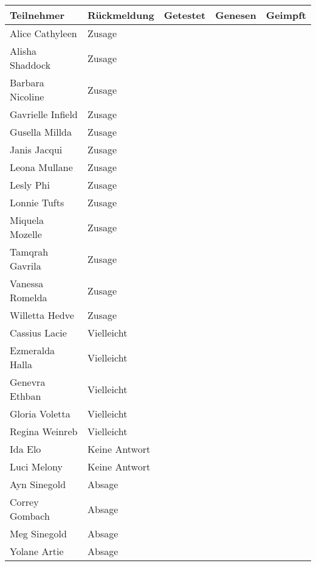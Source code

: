 \begin{tabular}{lllll}
\toprule
       Teilnehmer &   Rückmeldung & Getestet & Genesen & Geimpft \\
\midrule
  Alice Cathyleen &        Zusage &          &         &         \\
  Alisha Shaddock &        Zusage &          &         &         \\
 Barbara Nicoline &        Zusage &          &         &         \\
Gavrielle Infield &        Zusage &          &         &         \\
   Gusella Millda &        Zusage &          &         &         \\
     Janis Jacqui &        Zusage &          &         &         \\
    Leona Mullane &        Zusage &          &         &         \\
        Lesly Phi &        Zusage &          &         &         \\
     Lonnie Tufts &        Zusage &          &         &         \\
  Miquela Mozelle &        Zusage &          &         &         \\
  Tamqrah Gavrila &        Zusage &          &         &         \\
  Vanessa Romelda &        Zusage &          &         &         \\
   Willetta Hedve &        Zusage &          &         &         \\
    Cassius Lacie &    Vielleicht &          &         &         \\
  Ezmeralda Halla &    Vielleicht &          &         &         \\
   Genevra Ethban &    Vielleicht &          &         &         \\
   Gloria Voletta &    Vielleicht &          &         &         \\
   Regina Weinreb &    Vielleicht &          &         &         \\
          Ida Elo & Keine Antwort &          &         &         \\
      Luci Melony & Keine Antwort &          &         &         \\
     Ayn Sinegold &        Absage &          &         &         \\
   Correy Gombach &        Absage &          &         &         \\
     Meg Sinegold &        Absage &          &         &         \\
     Yolane Artie &        Absage &          &         &         \\
\bottomrule
\end{tabular}
